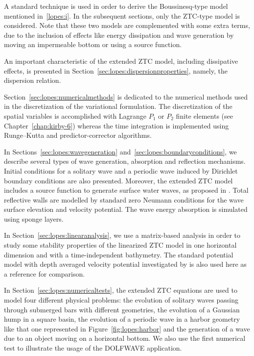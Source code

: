 A standard technique is used in order to derive the Boussinesq-type
model mentioned in~\ref{lopes:i}.  In the subsequent sections, only
the ZTC-type model is considered.  Note that these two models are
complemented with some extra terms, due to the inclusion of effects
like energy dissipation and wave generation by moving an impermeable
bottom or using a source function.

An important characteristic of the extended ZTC model, including
dissipative effects, is presented in
Section~\ref{sec:lopes:dispersionproperties}, namely, the dispersion
relation.

Section~\ref{sec:lopes:numericalmethods} is dedicated to the numerical
methods used in the discretization of the variational formulation.
The discretization of the spatial variables is accomplished with
Lagrange $P_1$ or $P_2$ finite elements (see
Chapter~\ref{chap:kirby-6}) whereas the time integration is
implemented using Runge--Kutta and predictor-corrector algorithms.

In Sections~\ref{sec:lopes:wavegeneration}
and~\ref{sec:lopes:boundaryconditions}, we describe several types of
wave generation, absorption and reflection mechanisms. Initial
conditions for a solitary wave and a periodic wave induced by
Dirichlet boundary conditions are also presented. Moreover, the
extended ZTC model includes a source function to generate surface
water waves, as proposed in \citet{WeiKirbySinha1999}. Total
reflective walls are modelled by standard zero Neumann conditions for
the wave surface elevation and velocity potential.  The wave energy
absorption is simulated using sponge layers.

In Section~\ref{sec:lopes:linearanalysis}, we use a matrix-based
analysis in order to study some stability properties of the linearized
ZTC model in one horizontal dimension and with a time-independent
bathymetry. The standard potential model with depth averaged velocity
potential investigated by \citet{LovholtPedersen2009} is also used
here as a reference for comparison.

In Section~\ref{sec:lopes:numericaltests}, the extended ZTC equations
are used to model four different physical problems: the evolution of
solitary waves passing through submerged bars with different
geometries, the evolution of a Gaussian hump in a square basin, the
evolution of a periodic wave in a harbor geometry like that one
represented in Figure~\ref{fig:lopes:harbor} and the generation of a
wave due to an object moving on a horizontal bottom. We also use the
first numerical test to illustrate the usage of the DOLFWAVE
application.

